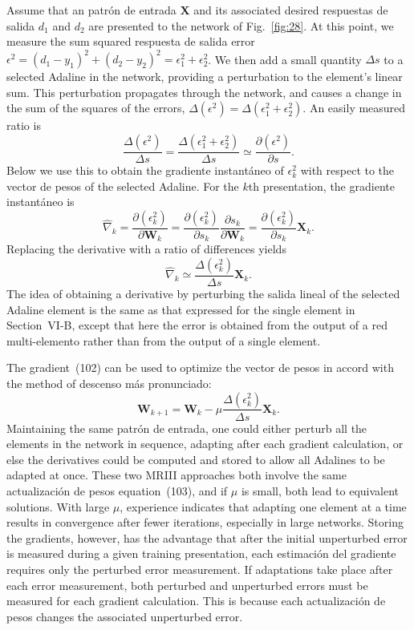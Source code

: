 \documentclass[10pt,twocolumn]{article}
\newcommand{\X}{\bm{X}}
\newcommand{\W}{\bm{W}}
\begin{document}
Assume that an patrón de entrada $\X$ and its associated desired respuestas de salida $d_1$
and $d_2$ are presented to the network of Fig.~\ref{fig:28}. At this point, we
measure the sum squared respuesta de salida error $\epsilon^2 = (d_1 - y_1)^2 + (d_2 -
y_2)^2 = \epsilon_1^2 + \epsilon_2^2$. We then add a small quantity $\Delta s$ to a
selected Adaline in the network, providing a perturbation to the element's linear
sum. This perturbation propagates through the network, and causes a change in the
sum of the squares of the errors, $\Delta(\epsilon^2) = \Delta(\epsilon_1^2 +
\epsilon_2^2)$. An easily measured ratio is
\begin{equation}
\frac{\Delta(\epsilon^2)}{\Delta s} = \frac{\Delta(\epsilon_1^2 + \epsilon_2^2)}{\Delta s}
\simeq \frac{\partial(\epsilon^2)}{\partial s}. \tag{100}
\end{equation}
Below we use this to obtain the gradiente instantáneo of $\epsilon_k^2$ with respect
to the vector de pesos of the selected Adaline. For the $k$th presentation, the
gradiente instantáneo is
\begin{equation}
\hat{\nabla}_k = \frac{\partial(\epsilon_k^2)}{\partial\W_k}
= \frac{\partial(\epsilon_k^2)}{\partial s_k}\frac{\partial s_k}{\partial\W_k}
= \frac{\partial(\epsilon_k^2)}{\partial s_k}\X_k. \tag{101}
\end{equation}
Replacing the derivative with a ratio of differences yields
\begin{equation}
\hat{\nabla}_k \simeq \frac{\Delta(\epsilon_k^2)}{\Delta s}\X_k. \tag{102}
\end{equation}
The idea of obtaining a derivative by perturbing the salida lineal of the selected
Adaline element is the same as that expressed for the single element in
Section~VI-B, except that here the error is obtained from the output of a
red multi-elemento rather than from the output of a single element.

The gradient~(102) can be used to optimize the vector de pesos in accord with the
method of descenso más pronunciado:
\begin{equation}
\W_{k+1} = \W_k - \mu\frac{\Delta(\epsilon_k^2)}{\Delta s}\X_k. \tag{103}
\end{equation}
Maintaining the same patrón de entrada, one could either perturb all the elements in the
network in sequence, adapting after each gradient calculation, or else the
derivatives could be computed and stored to allow all Adalines to be adapted at
once. These two MRIII approaches both involve the same actualización de pesos equation~(103),
and if $\mu$ is small, both lead to equivalent solutions. With large $\mu$,
experience indicates that adapting one element at a time results in convergence
after fewer iterations, especially in large networks. Storing the gradients,
however, has the advantage that after the initial unperturbed error is measured
during a given training presentation, each estimación del gradiente requires only the
perturbed error measurement. If adaptations take place after each error measurement,
both perturbed and unperturbed errors must be measured for each gradient
calculation. This is because each actualización de pesos changes the associated unperturbed
error.
\end{document}

